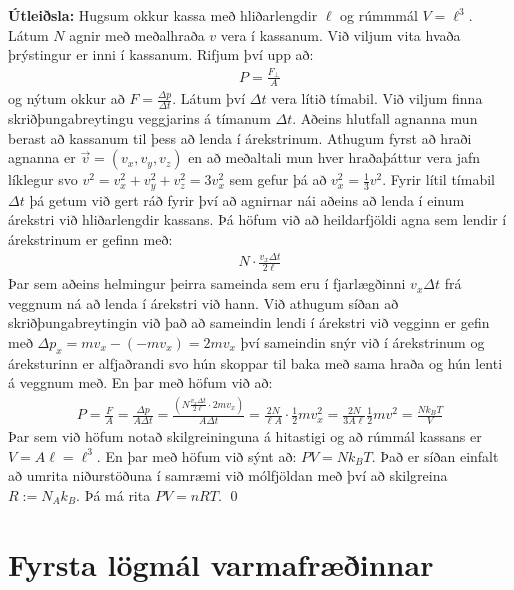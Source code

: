 \textbf{Útleiðsla:} Hugsum okkur kassa með hliðarlengdir $\ell$ og rúmmmál $V = \ell^3$. Látum $N$ agnir með meðalhraða $v$ vera í kassanum. Við viljum vita hvaða þrýstingur er inni í kassanum. Rifjum því upp að:
\begin{align*}
    P = \frac{F_{\perp}}{A}
\end{align*}
og nýtum okkur að $F = \frac{\Delta p}{\Delta t}$. Látum því $\Delta t$ vera lítið tímabil. Við viljum finna skriðþungabreytingu veggjarins á tímanum $\Delta t$. Aðeins hlutfall agnanna mun berast að kassanum til þess að lenda í árekstrinum. Athugum fyrst að hraði agnanna er $\Vec{v} = (v_x, v_y, v_z)$ en að meðaltali mun hver hraðaþáttur vera jafn líklegur svo $v^2 = v_x^2 + v_y^2 + v_z^2 = 3v_x^2$ sem gefur þá að $v_x^2 = \frac{1}{3}v^2$. Fyrir lítil tímabil $\Delta t$ þá getum við gert ráð fyrir því að agnirnar nái aðeins að lenda í einum árekstri við hliðarlengdir kassans. Þá höfum við að heildarfjöldi agna sem lendir í árekstrinum er gefinn með:
\begin{align*}
    N \cdot \frac{v_x \Delta t}{2 \ell}
\end{align*}
Þar sem aðeins helmingur þeirra sameinda sem eru í fjarlægðinni $v_x \Delta t$ frá veggnum ná að lenda í árekstri við hann. Við athugum síðan að skriðþungabreytingin við það að sameindin lendi í árekstri við vegginn er gefin með $\Delta p_x = mv_x - (-mv_x) = 2mv_x$ því sameindin snýr við í árekstrinum og áreksturinn er alfjaðrandi svo hún skoppar til baka með sama hraða og hún lenti á veggnum með. En þar með höfum við að:
\begin{align*}
   P = \frac{F}{A} = \frac{\Delta p}{A\Delta t} = \frac{ \left( N \frac{v_x \Delta t}{2\ell} \cdot 2mv_x  \right)}{A\Delta t} = \frac{2N}{\ell A} \cdot \frac{1}{2}mv_x^2 = \frac{2N}{3A\ell}\frac{1}{2}mv^2 = \frac{N k_B T}{V}
\end{align*}
Þar sem við höfum notað skilgreininguna á hitastigi og að rúmmál kassans er $V = A \ell = \ell^3$. En þar með höfum við sýnt að: $PV = Nk_B T$. Það er síðan einfalt að umrita niðurstöðuna í samræmi við mólfjöldan með því að skilgreina $R := N_A k_B$. Þá má rita $PV = nRT$. \qed

\section{Fyrsta lögmál varmafræðinnar}

